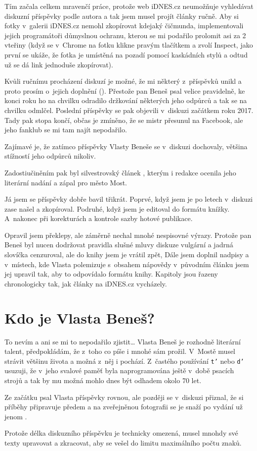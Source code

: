 Tím začala celkem mravenčí práce, protože web iDNES.cz neumožňuje vyhledávat
diskuzní příspěvky podle autora a tak jsem musel projít články ručně. Aby si
fotky v~galerii iDNES.cz nemohl zkopírovat kdejaký čičmunda, implementovali
jejich programátoři důmyslnou ochranu, kterou se mi podařilo prolomit asi za 2
vteřiny (když se v~Chrome na fotku klikne pravým tlačítkem a zvolí Inspect,
jako první se ukáže, že fotka je umístěná na pozadí pomocí kaskádních stylů a
odtud už se dá link jednoduše zkopírovat).

Kvůli ručnímu procházení diskuzí je možné, že mi některý z~příspěvků unikl a
proto prosím o~jejich doplnění ({\tt \from[mymail]}). Přestože pan Beneš psal velice pravidelně, ke
konci roku ho na chvilku odradilo držkování některých jeho odpůrců a tak se na
chvilku odmlčel. Poslední příspěvky se pak objevili v~diskuzi začátkem roku
2017. Tady pak stopa končí, občas je zmíněno, že se mistr přesunul na Facebook,
ale jeho fanklub se mi tam najít nepodařilo.

Zajímavé je, že zatímco příspěvky Vlasty Beneše se v~diskuzi dochovaly, většina
stížností jeho odpůrců nikoliv.

Zadostiučiněním pak byl silvestrovský článek {\em \from[10pohleduVlasty]},
kterým i redakce ocenila jeho literární nadání a zápal pro město Most.

Já jsem se příspěvky dobře bavil třikrát. Poprvé, když jsem je po letech
v~diskuzi zase našel a zkopíroval. Podruhé, když jsem je editoval do formátu
knížky. A~nakonec při korekturách a kontrole sazby hotové publikace.

Opravil jsem překlepy, ale záměrně nechal mnohé nespisovné výrazy. Protože pan
Beneš byl nucen dodržovat pravidla slušné mluvy diskuze vulgární a jadrná
slovíčka cenzuroval, ale do knihy jsem je vrátil zpět,  Dále jsem doplnil
nadpisy a v~místech, kde Vlasta polemizuje s~obsahem nápovědy v~původním článku
jsem jej upravil tak, aby to odpovídalo formátu knihy. Kapitoly jsou řazeny
chronologicky tak, jak články na iDNES.cz vycházely.

\section{Kdo je Vlasta Beneš?}

To nevím a ani se mi to nepodařilo zjistit\dots{} Vlasta Beneš je rozhodně literární
talent, předpokládám, že z~toho co píše i mnohé sám prožil. V~Mostě musel
strávit většinu života a možná z~něj i pochází. Z~častého používání {\tt t'}
nebo {\tt d'} usuzuji, že v~jeho svalové paměť byla naprogramována ještě v~době
psacích strojů a tak by mu možná mohlo dnes být odhadem okolo 70 let.

Ze začátku psal Vlasta příspěvky rovnou, ale později se v~diskuzi přiznal, že
si příběhy připravuje předem a na zveřejněnou fotografii se je snaží po vydání
už jenom .

Protože délka diskuzního příspěvku je technicky omezená, musel mnohdy své texty
upravovat a zkracovat, aby se vešel do limitu maximálního počtu znaků.

\stopcolumns %
